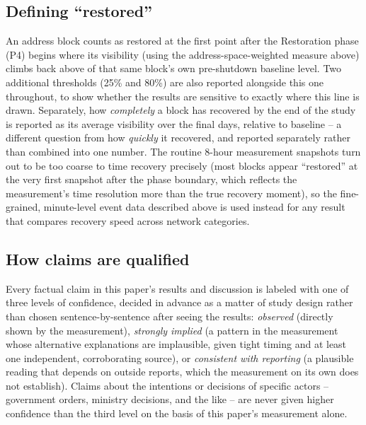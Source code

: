 \subsection{Defining ``restored''}

An address block counts as restored at the first point after the
Restoration phase (P4) begins where its visibility (using the
address-space-weighted measure above) climbs back above
\restorationPrimaryThresholdPct{} of that same block's own pre-shutdown
baseline level. Two additional thresholds (25\% and 80\%) are also
reported alongside this one throughout, to show whether the results are
sensitive to exactly where this line is drawn. Separately, how
\emph{completely} a block has recovered by the end of the study is reported
as its average visibility over the final \steadyStateDays{} days, relative
to baseline -- a different question from how \emph{quickly} it recovered,
and reported separately rather than combined into one number. The routine
8-hour measurement snapshots turn out to be too coarse to time recovery
precisely (most blocks appear ``restored'' at the very first snapshot after
the phase boundary, which reflects the measurement's time resolution more
than the true recovery moment), so the fine-grained, minute-level event
data described above is used instead for any result that compares recovery
speed across network categories.

\subsection{How claims are qualified}

Every factual claim in this paper's results and discussion is labeled with
one of three levels of confidence, decided in advance as a matter of
study design rather than chosen sentence-by-sentence after seeing the
results: \emph{observed} (directly shown by the measurement), \emph{strongly
implied} (a pattern in the measurement whose alternative explanations are
implausible, given tight timing and at least one independent, corroborating
source), or \emph{consistent with reporting} (a plausible reading that
depends on outside reports, which the measurement on its own does not
establish). Claims about the intentions or decisions of specific actors --
government orders, ministry decisions, and the like -- are never given
higher confidence than the third level on the basis of this paper's
measurement alone.
